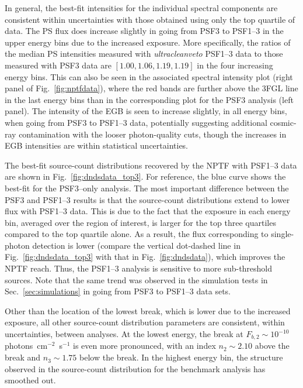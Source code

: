 In general, the best-fit intensities for the individual spectral components are consistent within uncertainties with those obtained using only the top quartile of data.  
The PS flux does increase slightly  in going from PSF3 to PSF1--3 in the upper energy bins due to the increased exposure.  More specifically, the ratios of the median PS intensities measured with {\it ultracleanveto} PSF1--3 data to those measured with PSF3 data are $[1.00,1.06,1.19,1.19]$ in the four increasing energy bins. 
This can also be seen in the associated spectral intensity plot (right panel of Fig.~\ref{fig:nptfdata}), where the red bands are further above the 3FGL line in the last energy bins than in the corresponding plot for the PSF3 analysis (left panel).   
The intensity of the EGB is seen to increase slightly, in all energy bins, when going from PSF3 to PSF1--3 data, potentially suggesting additional cosmic-ray contamination with the looser photon-quality cuts, though the increases in EGB intensities are within statistical uncertainties.     

The best-fit source-count distributions recovered by the NPTF with PSF1--3 data are shown in Fig.~\ref{fig:dndsdata_top3}.  For reference, the blue curve shows the best-fit for the PSF3--only analysis.  The most important difference between the PSF3 and PSF1--3 results is that the source-count distributions extend to lower flux with PSF1--3 data.  This is due to the fact that the exposure in each energy bin, averaged over the region of interest, is larger for the top three quartiles compared to the top quartile alone.  As a result, the flux corresponding to single-photon detection is lower (compare the vertical dot-dashed line in Fig.~\ref{fig:dndsdata_top3} with that in Fig.~\ref{fig:dndsdata}), which improves the NPTF reach.  Thus, the PSF1--3 analysis is sensitive to more sub-threshold sources.  
Note that the same trend was observed in the simulation tests in Sec.~\ref{sec:simulations} in going from PSF3 to PSF1--3 data sets.

Other than the location of the lowest break, which is lower due to the increased exposure, all other source-count distribution parameters are consistent, within uncertainties, between analyses.  At the lowest energy, the break at \mbox{$F_{b,2} \sim 10^{-10}$} photons~cm$^{-2}$~s$^{-1}$ is even more pronounced, with an index $n_2 \sim 2.10$ above the break and $n_3 \sim 1.75$ below the break.  In the highest energy bin, the structure observed in the source-count distribution for the benchmark analysis has smoothed out.


